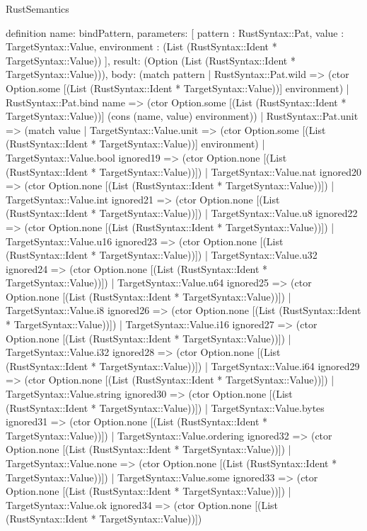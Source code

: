 \begin{lexlean}{RustSemantics}
\begin{semanticmodule}
definition{
  name: bindPattern,
  parameters: [
    pattern : RustSyntax::Pat,
    value : TargetSyntax::Value,
    environment : (List (RustSyntax::Ident * TargetSyntax::Value))
  ],
  result: (Option (List (RustSyntax::Ident * TargetSyntax::Value))),
  body: (match pattern
    | RustSyntax::Pat.wild => (ctor Option.some [(List (RustSyntax::Ident * TargetSyntax::Value))] environment)
    | RustSyntax::Pat.bind name => (ctor Option.some [(List (RustSyntax::Ident * TargetSyntax::Value))] (cons (name, value) environment))
    | RustSyntax::Pat.unit => (match value
      | TargetSyntax::Value.unit => (ctor Option.some [(List (RustSyntax::Ident * TargetSyntax::Value))] environment)
      | TargetSyntax::Value.bool ignored19 => (ctor Option.none [(List (RustSyntax::Ident * TargetSyntax::Value))])
      | TargetSyntax::Value.nat ignored20 => (ctor Option.none [(List (RustSyntax::Ident * TargetSyntax::Value))])
      | TargetSyntax::Value.int ignored21 => (ctor Option.none [(List (RustSyntax::Ident * TargetSyntax::Value))])
      | TargetSyntax::Value.u8 ignored22 => (ctor Option.none [(List (RustSyntax::Ident * TargetSyntax::Value))])
      | TargetSyntax::Value.u16 ignored23 => (ctor Option.none [(List (RustSyntax::Ident * TargetSyntax::Value))])
      | TargetSyntax::Value.u32 ignored24 => (ctor Option.none [(List (RustSyntax::Ident * TargetSyntax::Value))])
      | TargetSyntax::Value.u64 ignored25 => (ctor Option.none [(List (RustSyntax::Ident * TargetSyntax::Value))])
      | TargetSyntax::Value.i8 ignored26 => (ctor Option.none [(List (RustSyntax::Ident * TargetSyntax::Value))])
      | TargetSyntax::Value.i16 ignored27 => (ctor Option.none [(List (RustSyntax::Ident * TargetSyntax::Value))])
      | TargetSyntax::Value.i32 ignored28 => (ctor Option.none [(List (RustSyntax::Ident * TargetSyntax::Value))])
      | TargetSyntax::Value.i64 ignored29 => (ctor Option.none [(List (RustSyntax::Ident * TargetSyntax::Value))])
      | TargetSyntax::Value.string ignored30 => (ctor Option.none [(List (RustSyntax::Ident * TargetSyntax::Value))])
      | TargetSyntax::Value.bytes ignored31 => (ctor Option.none [(List (RustSyntax::Ident * TargetSyntax::Value))])
      | TargetSyntax::Value.ordering ignored32 => (ctor Option.none [(List (RustSyntax::Ident * TargetSyntax::Value))])
      | TargetSyntax::Value.none => (ctor Option.none [(List (RustSyntax::Ident * TargetSyntax::Value))])
      | TargetSyntax::Value.some ignored33 => (ctor Option.none [(List (RustSyntax::Ident * TargetSyntax::Value))])
      | TargetSyntax::Value.ok ignored34 => (ctor Option.none [(List (RustSyntax::Ident * TargetSyntax::Value))])
}
\end{semanticmodule}
\end{lexlean}
